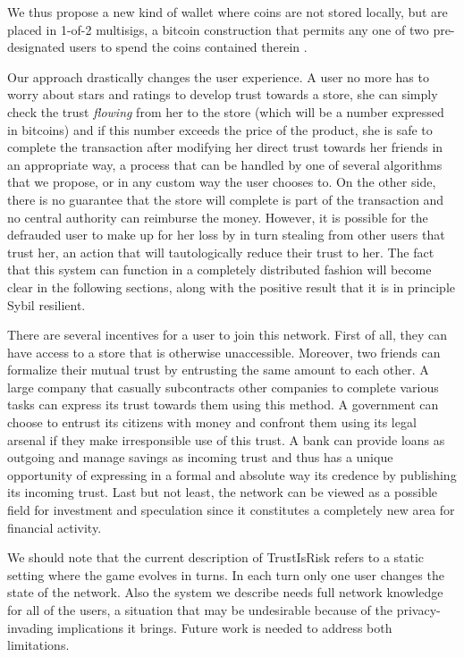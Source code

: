 \documentclass[11pt]{llncs}
\begin{document}
     We thus propose a new kind of wallet where coins are not stored locally, but are placed in 1-of-2 multisigs, a bitcoin
     construction that permits any one of two pre-designated users to spend the coins contained therein \cite{multisig}.

     Our approach drastically changes the user experience. A user no more has to worry about stars and ratings to develop
     trust towards a store, she can simply check the trust \textit{flowing} from her to the store (which will be a number
     expressed in bitcoins) and if this number exceeds the price of the product, she is safe to complete the transaction
     after modifying her direct trust towards her friends in an appropriate way, a process that can be handled by one of
     several algorithms that we propose, or in any custom way the user chooses to. On the other side, there is no guarantee
     that the store will complete is part of the transaction and no central authority can reimburse the money. However, it is
     possible for the defrauded user to make up for her loss by in turn stealing from other users that trust her, an action
     that will tautologically reduce their trust to her. The fact that this system can function in a completely distributed
     fashion will become clear in the following sections, along with the positive result that it is in principle Sybil
     resilient.

     There are several incentives for a user to join this network. First of all, they can have access to a store that is
     otherwise unaccessible. Moreover, two friends can formalize their mutual trust by entrusting the same amount to each
     other. A large company that casually subcontracts other companies to complete various tasks can express its trust
     towards them using this method. A government can choose to entrust its citizens with money and confront them using its
     legal arsenal if they make irresponsible use of this trust. A bank can provide loans as outgoing and manage savings as
     incoming trust and thus has a unique opportunity of expressing in a formal and absolute way its credence by publishing
     its incoming trust. Last but not least, the network can be viewed as a possible field for investment and speculation
     since it constitutes a completely new area for financial activity.

     We should note that the current description of TrustIsRisk refers to a static setting where the game evolves in turns.
     In each turn only one user changes the state of the network. Also the system we describe needs full network knowledge
     for all of the users, a situation that may be undesirable because of the privacy-invading implications it brings.
     Future work is needed to address both limitations.
\end{document}
